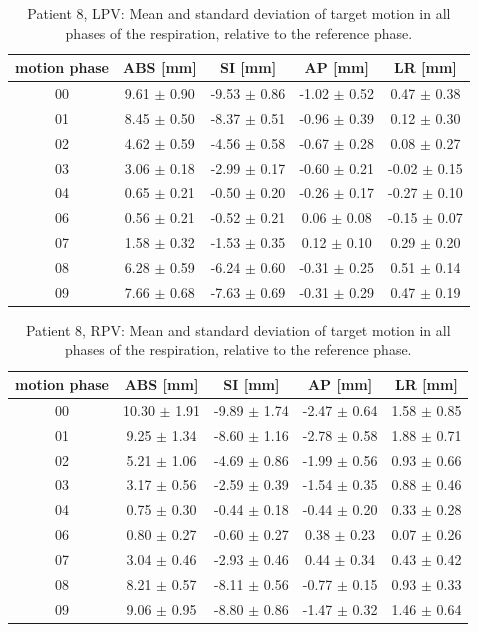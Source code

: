 \documentclass[type=dr, dr=rernat, accentcolor=tud7b,colorbacktitle, bigchapter, openright, twoside, 12pt ]{tudthesis}
\begin{document}

\begin{table}[H]
  \centering
  \caption{Patient 8, LPV: Mean and standard deviation of target motion in all phases of the respiration, relative to the reference phase.}
  \begin{tabular}{|c|c|c|c|c|}
    \hline\hline
    motion phase & ABS [mm] & SI [mm] & AP [mm] & LR [mm]\\
    \hline 
00& 9.61 $\pm$ 0.90& -9.53 $\pm$ 0.86& -1.02 $\pm$ 0.52& 0.47 $\pm$ 0.38 \\
01& 8.45 $\pm$ 0.50& -8.37 $\pm$ 0.51& -0.96 $\pm$ 0.39& 0.12 $\pm$ 0.30 \\
02& 4.62 $\pm$ 0.59& -4.56 $\pm$ 0.58& -0.67 $\pm$ 0.28& 0.08 $\pm$ 0.27 \\
03& 3.06 $\pm$ 0.18& -2.99 $\pm$ 0.17& -0.60 $\pm$ 0.21& -0.02 $\pm$ 0.15 \\
04& 0.65 $\pm$ 0.21& -0.50 $\pm$ 0.20& -0.26 $\pm$ 0.17& -0.27 $\pm$ 0.10 \\
06& 0.56 $\pm$ 0.21& -0.52 $\pm$ 0.21& 0.06 $\pm$ 0.08& -0.15 $\pm$ 0.07 \\
07& 1.58 $\pm$ 0.32& -1.53 $\pm$ 0.35& 0.12 $\pm$ 0.10& 0.29 $\pm$ 0.20 \\
08& 6.28 $\pm$ 0.59& -6.24 $\pm$ 0.60& -0.31 $\pm$ 0.25& 0.51 $\pm$ 0.14 \\
09& 7.66 $\pm$ 0.68& -7.63 $\pm$ 0.69& -0.31 $\pm$ 0.29& 0.47 $\pm$ 0.19 \\
        \hline\hline
  \end{tabular}
\end{table}

\begin{table}[H]
  \centering
  \caption{Patient 8, RPV: Mean and standard deviation of target motion in all phases of the respiration, relative to the reference phase.}
  \begin{tabular}{|c|c|c|c|c|}
    \hline\hline
    motion phase & ABS [mm] & SI [mm] & AP [mm] & LR [mm]\\
    \hline 
00& 10.30 $\pm$ 1.91& -9.89 $\pm$ 1.74& -2.47 $\pm$ 0.64& 1.58 $\pm$ 0.85 \\
01& 9.25 $\pm$ 1.34& -8.60 $\pm$ 1.16& -2.78 $\pm$ 0.58& 1.88 $\pm$ 0.71 \\ 
02& 5.21 $\pm$ 1.06& -4.69 $\pm$ 0.86& -1.99 $\pm$ 0.56& 0.93 $\pm$ 0.66 \\
03& 3.17 $\pm$ 0.56& -2.59 $\pm$ 0.39& -1.54 $\pm$ 0.35& 0.88 $\pm$ 0.46 \\ 
04& 0.75 $\pm$ 0.30& -0.44 $\pm$ 0.18& -0.44 $\pm$ 0.20& 0.33 $\pm$ 0.28 \\
06& 0.80 $\pm$ 0.27& -0.60 $\pm$ 0.27& 0.38 $\pm$ 0.23& 0.07 $\pm$ 0.26 \\
07& 3.04 $\pm$ 0.46& -2.93 $\pm$ 0.46& 0.44 $\pm$ 0.34& 0.43 $\pm$ 0.42 \\
08& 8.21 $\pm$ 0.57& -8.11 $\pm$ 0.56& -0.77 $\pm$ 0.15& 0.93 $\pm$ 0.33 \\
09& 9.06 $\pm$ 0.95& -8.80 $\pm$ 0.86& -1.47 $\pm$ 0.32& 1.46 $\pm$ 0.64 \\
        \hline\hline
  \end{tabular}
\end{table}
\end{document}
